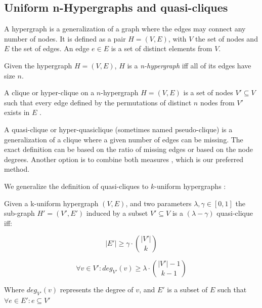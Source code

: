 \subsection{Uniform n-Hypergraphs and quasi-cliques}

A hypergraph is a generalization of a graph where the edges may connect any number
of nodes.
It is defined as a pair $H = (V, E)$, with $V$ the set of nodes and $E$ the set of edges. An edge $e \in E$ is a set of distinct elements from $V$.

\begin{definition}
    \label{def:khypergraph}    
    Given the hypergraph $H = (V, E)$, $H$ is a \emph{n-hypergraph} iff
    all of its edges have size $n$.
\end{definition}

A clique or hyper-clique on a $n$-hypergraph $H = (V, E)$ is a set of nodes
$V' \subseteq V$ such that
every edge defined by the permutations of distinct $n$ nodes from $V'$ exists in $E$
\cite{koeller2003discovery}.

A quasi-clique or hyper-quasiclique (sometimes named pseudo-clique) is a generalization of a clique
where a given number of edges can be missing. The exact definition can be based
on the ratio of missing edges or based on the node degrees. Another option
is to combine both measures \cite{brunato2007effectively}, which is our preferred method.

We generalize the definition of quasi-cliques to $k$-uniform hypergraphs :

\begin{definition}
    \label{def:quasi_clique}
    Given a k-uniform hypergraph $(V,E)$, and two parameters $\lambda, \gamma \in [0,1]$
    the sub-graph $H'=(V',E')$ induced by a subset $V' \subseteq V$ is a
    $(\lambda-\gamma)$ quasi-clique iff:
    
    \begin{equation}
        |E'| \ge \gamma \cdot \binom{|V'|}{k}
        \label{eq:edge_hyperclique}
    \end{equation}
    
    \begin{equation}
        \forall v \in V': deg_{V'}(v) \ge \lambda \cdot \binom{|V'| - 1}{k - 1}
        \label{eq:deg_hyperclique}
    \end{equation}
    
    Where $deg_{V'}(v)$ represents the degree of $v$, and $E'$ is a subset of $E$ such that
    $\forall e \in E' : e \subseteq V'$
\end{definition}

